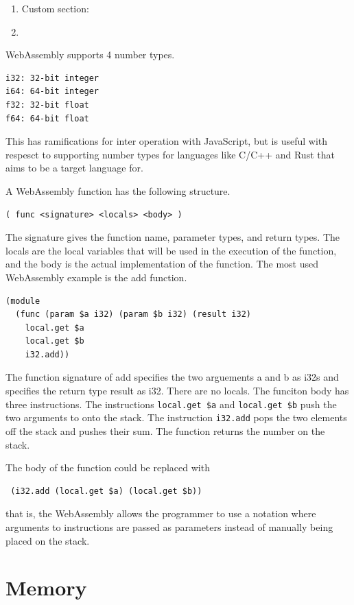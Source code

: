 \documentclass[11pt]{book}
\begin{document}
\begin{enumerate}
\addtocounter{enumi}{-1}
\item Custom section: 
\item 
\end{enumerate}


WebAssembly supports 4 number types.
\begin{verbatim}
i32: 32-bit integer
i64: 64-bit integer
f32: 32-bit float
f64: 64-bit float
\end{verbatim}
This has ramifications for inter operation with JavaScript, but is useful with respesct to supporting number types for languages like C/C++ and Rust that aims to be a target language for. 

A WebAssembly function has the following structure.
\begin{verbatim}
( func <signature> <locals> <body> )
\end{verbatim}
The signature gives the function name, parameter types, and return types. The locals are the local variables that will be used in the execution of the function, and the body is the actual implementation of the function. The most used WebAssembly example is the add function. 

\begin{verbatim}
(module
  (func (param $a i32) (param $b i32) (result i32)
    local.get $a
    local.get $b
    i32.add))
\end{verbatim}

The function signature of add specifies the two arguements a and b as i32s and specifies the return type result as i32. There are no locals. The funciton body has three instructions. The instructions \texttt{local.get \$a} and \texttt{local.get \$b} push the two arguments to onto the stack. The instruction \texttt{i32.add} pops the two elements off the stack and pushes their sum. The function returns the number on the stack. 

The body of the function could be replaced with 
\begin{verbatim}
 (i32.add (local.get $a) (local.get $b))
\end{verbatim}
that is, the WebAssembly allows the programmer to use a notation where arguments to instructions are passed as parameters instead of manually being placed on the stack.



\section{Memory}
\end{document}
